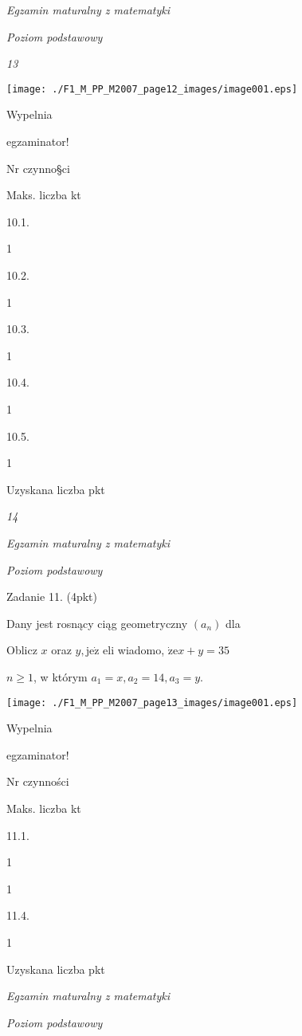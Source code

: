 \documentclass[a4paper,12pt]{article}
\begin{document}
{\it Egzamin maturalny z matematyki}

{\it Poziom podstawowy}

{\it 13}
\begin{center}
\texttt{[image: ./F1\_M\_PP\_M2007\_page12\_images/image001.eps]}
\end{center}
Wypelnia

egzaminator!

Nr czynno\S ci

Maks. liczba kt

10.1.

1

10.2.

1

10.3.

1

10.4.

1

10.5.

1

Uzyskana liczba pkt





{\it 14}

{\it Egzamin maturalny z matematyki}

{\it Poziom podstawowy}

Zadanie 11. (4pkt)

Dany jest rosnący ciąg geometryczny $(a_{n})$ dla

Oblicz $x$ oraz $y, \mathrm{j}\mathrm{e}\dot{\mathrm{z}}$ eli wiadomo, $\dot{\mathrm{z}}\mathrm{e}x+y=35$

$n\geq 1$, w którym $a_{1}=x, a_{2}=14, a_{3}=y.$
\begin{center}
\texttt{[image: ./F1\_M\_PP\_M2007\_page13\_images/image001.eps]}
\end{center}
Wypelnia

egzaminator!

Nr czynności

Maks. liczba kt

11.1.

1

1

11.4.

1

Uzyskana liczba pkt





{\it Egzamin maturalny z matematyki}

{\it Poziom podstawowy}
\end{document}
